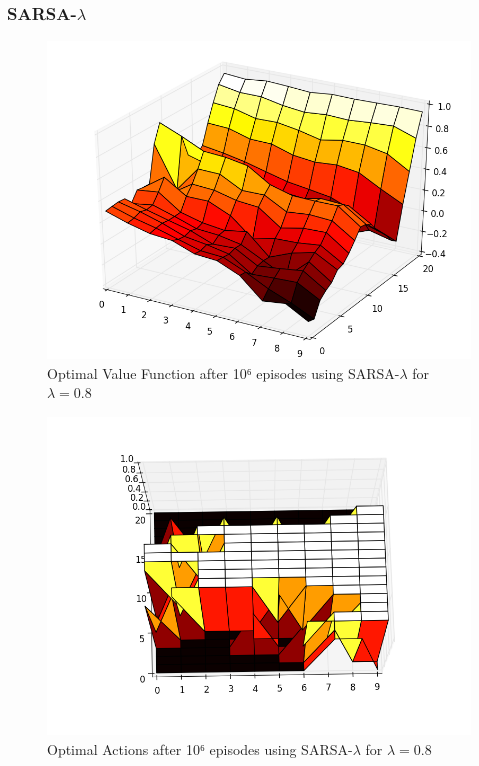 \documentclass[12pt,a4paper]{article}
\begin{document}
\subsubsection{SARSA-$\lambda$}

\begin{figure}[!ht]
   \caption{\label{E21_SL_V} Optimal Value Function after 10⁶ episodes using SARSA-$\lambda$ for $\lambda=0.8$}
   \includegraphics[scale=0.5]{Easy21_Results/Sarsa_lambda_0_8_value_1e6.png}
\end{figure}

\begin{figure}[!ht]
   \caption{\label{E21_SL_D} Optimal Actions after 10⁶ episodes using SARSA-$\lambda$ for $\lambda=0.8$}
   \includegraphics[scale=0.5]{Easy21_Results/Sarsa_lambda_0_8_decision_1e6.png}
\end{figure}
\end{document}
